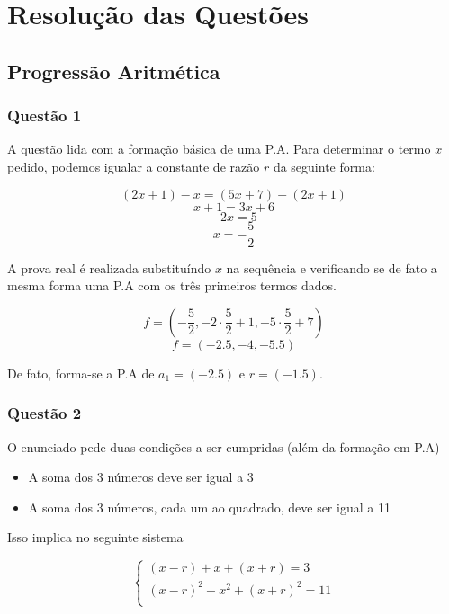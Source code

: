 \section*{Resolução das Questões}
\subsection*{Progressão Aritmética}

\subsubsection*{Questão 1}

\hrulefill

A questão lida com a formação básica de uma P.A. Para determinar o termo $x$ pedido, podemos igualar a constante de razão $r$ da seguinte forma:

\begin{tcolorbox}[colback=LightYellow]
\[(2x + 1) - x = (5x + 7) - (2x + 1)\]
\[x + 1 = 3x + 6\]
\[-2x = 5\]
\[x = -\frac{5}{2}\]
\end{tcolorbox}

A prova real é realizada substituíndo $x$ na sequência e verificando se de fato a mesma forma uma P.A com os três primeiros termos dados.

\begin{tcolorbox}[colback=LightYellow]
\[f = \left(-\frac{5}{2}, -2\cdot \frac{5}{2} + 1, -5\cdot \frac{5}{2} + 7 \right)\]
\[f = \left(-2.5, -4, -5.5\right)\]
\end{tcolorbox}

De fato, forma-se a P.A de $a_{1} = (-2.5)$ e $r = (-1.5)$.

\subsubsection*{Questão 2}

\hrulefill

O enunciado pede duas condições a ser cumpridas (além da formação em P.A)

\begin{itemize}
  \item A soma dos 3 números deve ser igual a 3
  \item A soma dos 3 números, cada um ao quadrado, deve ser igual a 11
\end{itemize}

Isso implica no seguinte sistema

\begin{tcolorbox}[colback=LightYellow]
\begin{equation*}
\begin{cases}
  (x - r) + x + (x + r) = 3 \\
  (x - r)^2 + x^2 + (x + r)^2 = 11 \\
\end{cases}
\end{equation*}
\end{tcolorbox}

